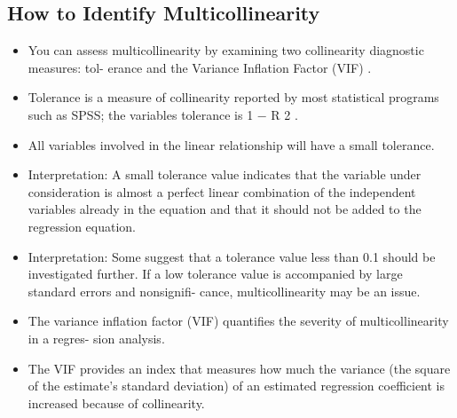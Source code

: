 \documentclass[a4paper,12pt]{article}
\begin{document}
\subsection{How to Identify Multicollinearity}
\begin{itemize}
\item You can assess multicollinearity by examining two collinearity diagnostic measures: tol-
erance and the Variance Inflation Factor (VIF) .
\item Tolerance is a measure of collinearity reported by most statistical programs such as SPSS;
the variables tolerance is 1 − R 2 .
\item All variables involved in the linear relationship will have a small tolerance.
\item Interpretation: A small tolerance value indicates that the variable under consideration
is almost a perfect linear combination of the independent variables already in the equation
and that it should not be added to the regression equation.
\item Interpretation: Some suggest that a tolerance value less than 0.1 should be investigated
further. If a low tolerance value is accompanied by large standard errors and nonsignifi-
cance, multicollinearity may be an issue.
\item The variance inflation factor (VIF) quantifies the severity of multicollinearity in a regres-
sion analysis.
\item The VIF provides an index that measures how much the variance (the square of the
estimate’s standard deviation) of an estimated regression coefficient is increased because
of collinearity.
\end{itemize}
\end{document}
